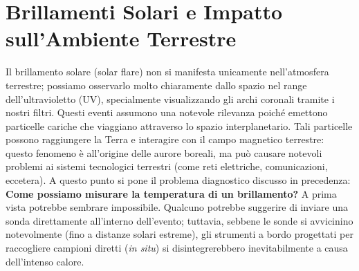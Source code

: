 \section{Brillamenti Solari e Impatto sull'Ambiente Terrestre}Il brillamento solare (solar flare) non si manifesta unicamente nell'atmosfera terrestre; possiamo osservarlo molto chiaramente dallo spazio nel range dell'ultravioletto (UV), specialmente visualizzando gli archi coronali tramite i nostri filtri. Questi eventi assumono una notevole rilevanza poiché emettono particelle cariche che viaggiano attraverso lo spazio interplanetario. Tali particelle possono raggiungere la Terra e interagire con il campo magnetico terrestre: questo fenomeno è all'origine delle aurore boreali, ma può causare notevoli problemi ai sistemi tecnologici terrestri (come reti elettriche, comunicazioni, eccetera). A questo punto si pone il problema diagnostico discusso in precedenza: \textbf{Come possiamo misurare la temperatura di un brillamento?} A prima vista potrebbe sembrare impossibile. Qualcuno potrebbe suggerire di inviare una sonda direttamente all'interno dell'evento; tuttavia, sebbene le sonde si avvicinino notevolmente (fino a distanze solari estreme), gli strumenti a bordo progettati per raccogliere campioni diretti (\textit{in situ}) si disintegrerebbero inevitabilmente a causa dell'intenso calore.

